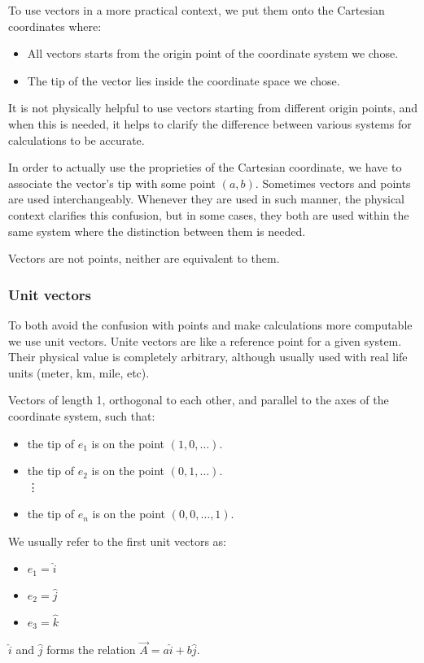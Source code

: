 \label{sub:cartesian}


To use vectors in a more practical context, we put them onto the Cartesian coordinates where:
\begin{itemize}
    \item All vectors starts from the origin point of the coordinate system we chose.
    \item The tip of the vector lies inside the coordinate space we chose.
\end{itemize}

It is not physically helpful to use vectors starting from different origin points, and when this is needed, it helps to clarify the difference between various systems for calculations to be accurate.

In order to actually use the proprieties of the Cartesian coordinate, we have to associate the vector's tip with some point $(a,b)$. Sometimes vectors and points are used interchangeably. Whenever they are used in such manner, the physical context clarifies this confusion, but in some cases, they both are used within the same system where the distinction between them is needed.

\begin{note}
    Vectors are not points, neither are equivalent to them.
\end{note}

\subsubsection{Unit vectors}%
\label{ssub:unit-vectors}


To both avoid the confusion with points and make calculations more computable we use unit vectors. Unite vectors are like a reference point for a given system. Their physical value is completely arbitrary, although usually used with real life units (meter, km, mile, etc).

\begin{definition}
    Vectors of length 1, orthogonal to each other, and parallel to the axes of the coordinate system, such that:
    \begin{itemize}
        \item the tip of $e_1$ is on the point $(1,0,\ldots)$.
        \item the tip of $e_2$ is on the point $(0,1,\ldots)$.
            \\ \vdots
        \item the tip of $e_n$ is on the point $(0,0,\ldots,1)$.
    \end{itemize}
\end{definition}

We usually refer to the first unit vectors as:
\begin{itemize}
    \item $e_1 = \hat{i}$
    \item $e_2 = \hat{j}$
    \item $e_3 = \hat{k}$
\end{itemize}

$\hat{i}$ and $\hat{j}$ forms the relation $\vec{A}=a\hat{i}+b\hat{j}$.

\newpage

